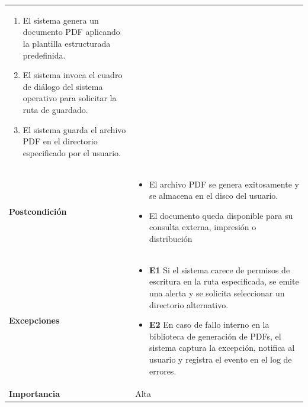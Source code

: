 \begin{center}
\begin{longtable}{ p{} p{} }
\begin{enumerate}
          \item El sistema genera un documento PDF aplicando la plantilla estructurada predefinida.
          \item El sistema invoca el cuadro de diálogo del sistema operativo para solicitar la ruta de guardado.
          \item El sistema guarda el archivo PDF en el directorio especificado por el usuario.
        \end{enumerate}\\
      \textbf{Postcondición}        &
        \begin{itemize}
          \tightlist
          \item El archivo PDF se genera exitosamente y se almacena en el disco del usuario.
          \item El documento queda disponible para su consulta externa, impresión o distribución
        \end{itemize}\\
      \textbf{Excepciones}          &
        \begin{itemize}
          \tightlist
          \item \textbf{E1} Si el sistema carece de permisos de escritura en la ruta especificada, se emite una alerta y se solicita seleccionar un directorio alternativo.
          \item \textbf{E2} En caso de fallo interno en la biblioteca de generación de PDFs, el sistema captura la excepción, notifica al usuario y registra el evento en el log de errores.
        \end{itemize}\\
      \textbf{Importancia}          & Alta \\
      \bottomrule
    \end{longtable}
\end{center}
